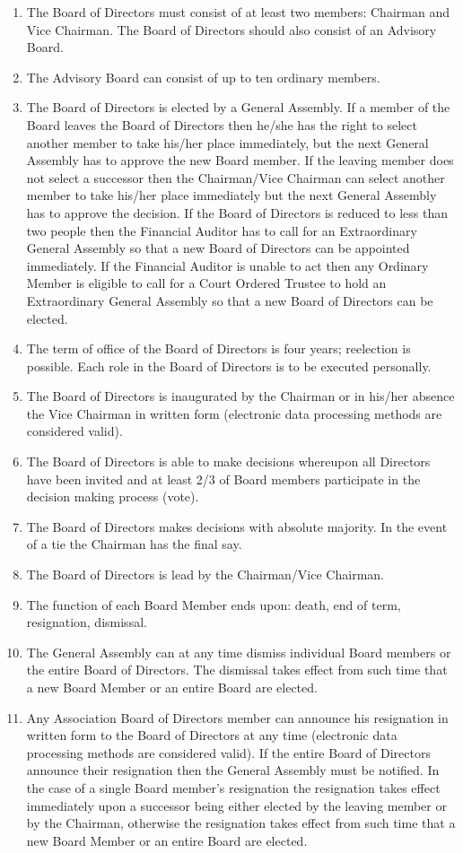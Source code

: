 \begin{enumerate}
\item The Board of Directors must consist of at least two members: Chairman and Vice Chairman. The Board of Directors should also consist of an Advisory Board.
\item The Advisory Board can consist of up to ten ordinary members.
\item The Board of Directors is elected by a General Assembly. If a member of the Board leaves the Board of Directors then he/she has the right to select another member to take his/her place immediately, but the next General Assembly has to approve the new Board member. If the leaving member does not select a successor then the Chairman/Vice Chairman can select another member to take his/her place immediately but the next General Assembly has to approve the decision. If the Board of Directors is reduced to less than two people then the Financial Auditor has to call for an Extraordinary General Assembly so that a new Board of Directors can be appointed immediately. If the Financial Auditor is unable to act then any Ordinary Member is eligible to call for a Court Ordered Trustee to hold an Extraordinary General Assembly so that a new Board of Directors can be elected.
\item The term of office of the Board of Directors is four years; reelection is possible. Each role in the Board of Directors is to be executed personally.
\item The Board of Directors is inaugurated by the Chairman or in his/her absence the Vice Chairman in written form (electronic data processing methods are considered valid).
\item The Board of Directors is able to make decisions whereupon all Directors have been invited and at least 2/3 of Board members participate in the decision making process (vote).
\item The Board of Directors makes decisions with absolute majority. In the event of a tie the Chairman has the final say.
\item The Board of Directors is lead by the Chairman/Vice Chairman.
\item The function of each Board Member ends upon: death, end of term, resignation, dismissal.
\item The General Assembly can at any time dismiss individual Board members or the entire Board of Directors. The dismissal takes effect from such time that a new Board Member or an entire Board are elected.
\item Any Association Board of Directors member can announce his resignation in written form to the Board of Directors at any time (electronic data processing methods are considered valid). If the entire Board of Directors announce their resignation then the General Assembly must be notified. In the case of a single Board member’s resignation the resignation takes effect immediately upon a successor being either elected by the leaving member or by the Chairman, otherwise the resignation takes effect from such time that a new Board Member or an entire Board are elected.
\end{enumerate}




